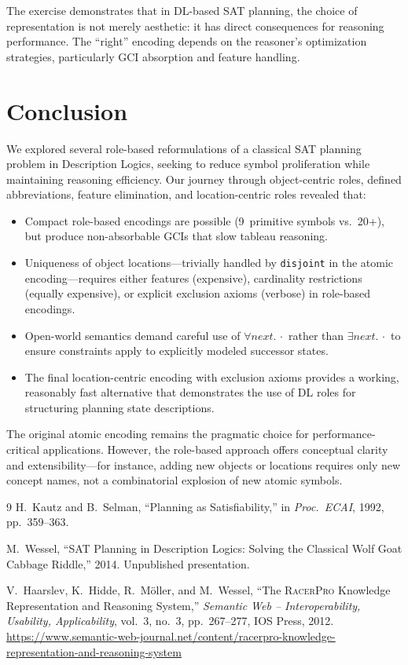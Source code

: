 \documentclass[11pt,a4paper]{article}
\newcommand{\DLsome}[2]{\exists #1.\,#2}
\newcommand{\DLall}[2]{\forall #1.\,#2}
\newcommand{\role}[1]{\ensuremath{\mathit{#1}}}
\begin{document}
The exercise demonstrates that in DL-based SAT planning, the choice of
representation is not merely aesthetic: it has direct consequences for
reasoning performance.  The ``right'' encoding depends on the reasoner's
optimization strategies, particularly GCI absorption and feature
handling.

\section{Conclusion}
\label{sec:conclusion}

We explored several role-based reformulations of a classical SAT
planning problem in Description Logics, seeking to reduce symbol
proliferation while maintaining reasoning efficiency.  Our journey
through object-centric roles, defined abbreviations, feature
elimination, and location-centric roles revealed that:

\begin{itemize}[nosep]
\item Compact role-based encodings are possible (9~primitive symbols
  vs.\ 20+), but produce non-absorbable GCIs that slow tableau
  reasoning.
\item Uniqueness of object locations---trivially handled by
  \texttt{disjoint} in the atomic encoding---requires either features
  (expensive), cardinality restrictions (equally expensive), or
  explicit exclusion axioms (verbose) in role-based encodings.
\item Open-world semantics demand careful use of
  $\DLall{\role{next}}{\cdot}$ rather than
  $\DLsome{\role{next}}{\cdot}$ to ensure constraints apply to
  explicitly modeled successor states.
\item The final location-centric encoding with exclusion axioms
  provides a working, reasonably fast alternative that demonstrates
  the use of DL roles for structuring planning state descriptions.
\end{itemize}

The original atomic encoding remains the pragmatic choice for
performance-critical applications.  However, the role-based approach
offers conceptual clarity and extensibility---for instance, adding new
objects or locations requires only new concept names, not a combinatorial
explosion of new atomic symbols.

\begin{thebibliography}{9}
  H.~Kautz and B.~Selman,
  ``Planning as Satisfiability,''
  in \textit{Proc.\ ECAI}, 1992, pp.~359--363.

  M.~Wessel,
  ``SAT Planning in Description Logics: Solving the Classical Wolf Goat Cabbage Riddle,''
  2014. Unpublished presentation.

  V.~Haarslev, K.~Hidde, R.~M{\"o}ller, and M.~Wessel,
  ``The \textsc{RacerPro} Knowledge Representation and Reasoning System,''
  \textit{Semantic Web -- Interoperability, Usability, Applicability},
  vol.~3, no.~3, pp.~267--277, IOS Press, 2012.
  \url{https://www.semantic-web-journal.net/content/racerpro-knowledge-representation-and-reasoning-system}
\end{thebibliography}
\end{document}
